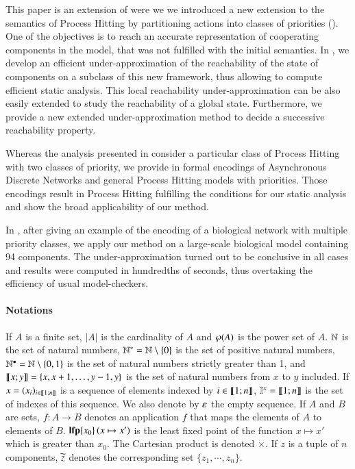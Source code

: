 This paper is an extension of \cite{FPMR13-CS2Bio} were we
we introduced a new extension to the semantics of Process Hitting by partitioning actions into classes of priorities
().
One of the objectives is to reach an accurate representation of cooperating components in the model, that was not fulfilled with the initial semantics.
In ,
we develop an efficient under-approximation of the reachability of the state of components on a subclass of this new framework, thus allowing to compute efficient static analysis.
This local reachability under-approximation can be also easily extended to study the reachability of a global state.
Furthermore, we provide a new extended under-approximation method to decide a successive reachability property.

Whereas the analysis presented in  consider a particular class of
Process Hitting with two classes of priority,
we provide in  formal encodings of Asynchronous Discrete Networks and general
Process Hitting models with priorities.
Those encodings result in Process Hitting fulfilling the conditions for our
static analysis and show the broad applicability of our method.

In , after giving an example of the encoding of a biological
network with multiple priority classes,
we apply our method on a large-scale biological model containing 94 components.
The under-approximation turned out to be conclusive in all cases and results were computed in hundredths of seconds,
thus overtaking the efficiency of usual model-checkers.



\paragraph*{Notations}

If $A$ is a finite set,
$|A|$ is the cardinality of $A$
and $\wp(A)$ is the power set of $A$.
$\mathbb{N}$ is the set of natural numbers,
$\mathbb{N}^* = \mathbb{N} \setminus \{ 0 \}$ is the set of positive natural numbers,
$\mathbb{N}^\bullet = \mathbb{N} \setminus \{ 0, 1 \}$ is the set of natural numbers strictly greater than 1,
and $\llbracket x; y \rrbracket = \{ x, x+1, \dots, y-1, y \}$ is the set of natural numbers from $x$ to $y$ included.
If $x = (x_i)_{i \in \llbracket 1; n \rrbracket}$ is a sequence of elements indexed by $i \in \llbracket 1; n \rrbracket$,
$\mathbb{I}^{x} = \llbracket 1; n \rrbracket$ is the set of indexes of this sequence.
We also denote by $\varepsilon$ the empty sequence.
If $A$ and $B$ are sets,
$f : A \rightarrow B$ denotes an application $f$ that maps the elements of $A$ to elements of $B$.
$\mathbf{lfp}\{x_0\}\left(x\mapsto x'\right)$ is the least fixed point of the function $x \mapsto x'$ which is greater than $x_0$.
The Cartesian product is denoted $\times$.
If $z$ is a tuple of $n$ components, $\widetilde{z}$ denotes the corresponding set
	$\{z_1, \cdots, z_n\}$.

